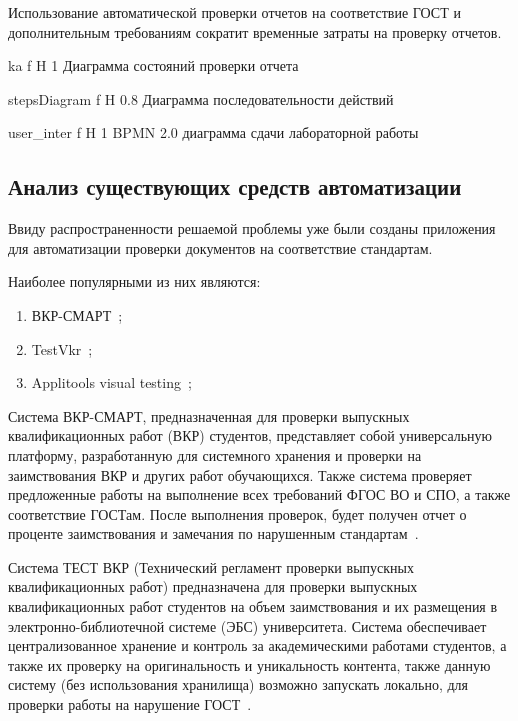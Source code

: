 Использование автоматической проверки отчетов на соответствие ГОСТ и дополнительным требованиям сократит временные затраты на проверку отчетов.


{ka} %
{f} %
{H} %
{1\textwidth} %
{Диаграмма состояний проверки отчета} %

{stepsDiagram} %
{f} %
{H} %
{0.8\textwidth} %
{Диаграмма последовательности действий} %

{user_inter} %
{f} %
{H} %
{1\textwidth} %
{BPMN 2.0 диаграмма сдачи лабораторной работы} %




\subsection{Анализ существующих средств автоматизации}
Ввиду распространенности решаемой проблемы уже были созданы приложения для автоматизации проверки документов на соответствие стандартам.

Наиболее популярными из них являются:
\begin{enumerate}
	\item ВКР-СМАРТ~\cite{VKR_VYZ};
	\item TestVkr~\cite{TestVkr};
	\item Applitools visual testing~\cite{PdfTest};
\end{enumerate}

Система ВКР-СМАРТ, предназначенная для проверки выпускных квалификационных работ (ВКР) студентов, представляет собой универсальную платформу, разработанную для системного хранения и проверки на заимствования ВКР и других работ обучающихся. Также система проверяет предложенные работы на выполнение всех требований ФГОС ВО и СПО, а также соответствие ГОСТам. После выполнения проверок, будет получен отчет о проценте заимствования и замечания по нарушенным стандартам~\cite{VKR_VYZ}.

Система ТЕСТ ВКР (Технический регламент проверки выпускных квалификационных работ) предназначена для проверки выпускных квалификационных работ студентов на объем заимствования и их размещения в электронно-библиотечной системе (ЭБС) университета. Система обеспечивает централизованное хранение и контроль за академическими работами студентов, а также их проверку на оригинальность и уникальность контента, также данную систему (без использования хранилища) возможно запускать локально, для проверки работы на нарушение ГОСТ~\cite{TestVkr}.

